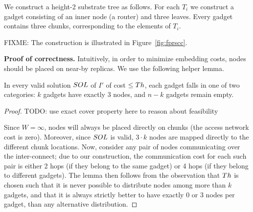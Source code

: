 We construct a height-2 substrate tree
as follows. For each $T_i$ we construct a gadget
consisting of an inner node (a router) and three leaves. Every gadget
contains three chunks, corresponding to the elements of $T_i$.

FIXME: The construction is illustrated in Figure~\ref{fig:fprscc}.

\textbf{Proof of correctness.}
Intuitively, in order to minimize embedding costs,
nodes should be placed on near-by replicas. We use the following
helper lemma.
\begin{lemma}\label{lemma:helper}
In every valid solution $SOL$ of $I'$ of cost $\leq Th$, each gadget
falls in one of two categories:
$k$ gadgets have exactly
$3$ nodes, and $n-k$ gadgets remain empty.
\end{lemma}
\begin{proof}
TODO: use exact cover property here to reason about feasibility

Since $W=\infty$, nodes will always be placed
directly on chunks (the access network cost is zero).
Moreover, since
$SOL$ is valid, $3 \cdot k$ nodes are mapped
directly to the different chunk locations.
Now, consider any pair of nodes communicating over the
inter-connect; due to our construction, the communication cost
for each such pair is either
2 hops (if they belong to the same gadget) or 4 hops (if they belong
to different gadgets).
The lemma then follows from the observation that $Th$
is chosen such that it is never possible to distribute nodes
among more than $k$ gadgets, and that it is always strictly better to
have exactly 0 or 3 nodes per gadget, than any alternative distribution.
\end{proof}

